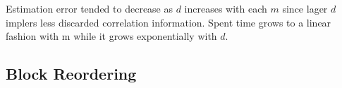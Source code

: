 
			

			

Estimation error tended to decrease as $d$ increases with each $m$ since lager $d$ implers less discarded correlation information. Spent time grows to a linear fashion with m while it grows exponentially with $d$.

\subsection{Block Reordering}
